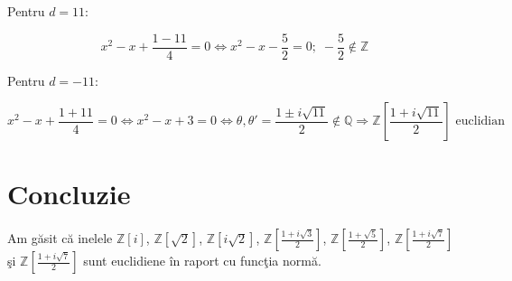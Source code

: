 \documentclass[12t]{article}
\begin{document}
Pentru $d = 11$:

\begin{equation*}
    x^2 - x + \frac{1 - 11}{4} = 0
    \Leftrightarrow x^2 - x - \frac{5}{2} = 0; \; -\frac{5}{2} \notin \mathbb{Z}
\end{equation*}

Pentru $d = -11$:

\begin{equation}
    x^2 - x + \frac{1 + 11}{4} = 0
    \Leftrightarrow x^2 - x + 3 = 0
    \Leftrightarrow \theta, \theta' = \frac{1 \pm i\sqrt{11}}{2} \notin \mathbb{Q}
    \Rightarrow \boxed{\mathbb{Z}\left[\frac{1 + i\sqrt{11}}{2}\right] \text{ euclidian}}
\end{equation}

\section*{Concluzie}
Am găsit că inelele
$\mathbb{Z}[i]$,
$\mathbb{Z}[\sqrt{2}]$,
$\mathbb{Z}[i\sqrt{2}]$,
$\mathbb{Z}\left[\frac{1 + i\sqrt{3}}{2}\right]$,
$\mathbb{Z}\left[\frac{1 + \sqrt{5}}{2}\right]$,
$\mathbb{Z}\left[\frac{1 + i\sqrt{7}}{2}\right]$ şi
$\mathbb{Z}\left[\frac{1 + i\sqrt{7}}{2}\right]$
sunt euclidiene în raport cu funcţia normă.
\end{document}

